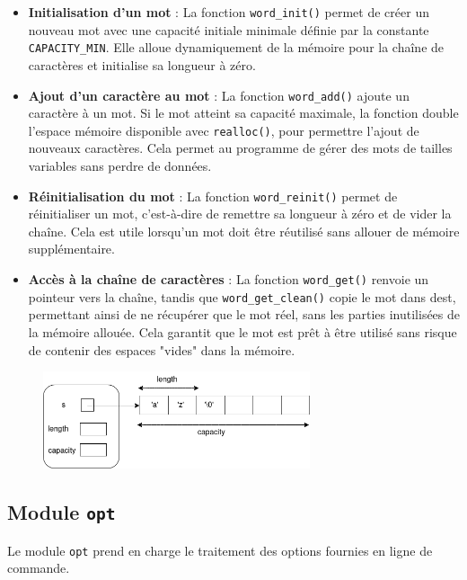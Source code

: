 \documentclass{article}
\begin{document}
\begin{itemize}
    \item \textbf{Initialisation d’un mot} : La fonction \texttt{word\_init()} permet de créer un nouveau mot avec une capacité initiale minimale définie par la constante \texttt{CAPACITY\_MIN}. Elle alloue dynamiquement de la mémoire pour la chaîne de caractères et initialise sa longueur à zéro.
    
    \item \textbf{Ajout d’un caractère au mot} : La fonction \texttt{word\_add()} ajoute un caractère à un mot. Si le mot atteint sa capacité maximale, la fonction double l'espace mémoire disponible avec \texttt{realloc()}, pour permettre l'ajout de nouveaux caractères. Cela permet au programme de gérer des mots de tailles variables sans perdre de données.
    
    \item \textbf{Réinitialisation du mot} : La fonction \texttt{word\_reinit()} permet de réinitialiser un mot, c'est-à-dire de remettre sa longueur à zéro et de vider la chaîne. Cela est utile lorsqu'un mot doit être réutilisé sans allouer de mémoire supplémentaire.
    
    \item \textbf{Accès à la chaîne de caractères} : La fonction \texttt{word\_get()} renvoie un pointeur vers la chaîne, tandis que \texttt{word\_get\_clean()} copie le mot dans dest, permettant ainsi de ne récupérer que le mot réel, sans les parties inutilisées de la mémoire allouée. Cela garantit que le mot est prêt à être utilisé sans risque de contenir des espaces "vides" dans la mémoire.
\end{itemize}


\begin{figure}[h]
    \centering
    \includegraphics[width=0.7\textwidth]{word_schema.png} 
    \label{fig:structure_word_schema} 
\end{figure}

\subsection{Module \texttt{opt}}

Le module \texttt{opt} prend en charge le traitement des options fournies en ligne de commande.
\end{document}
